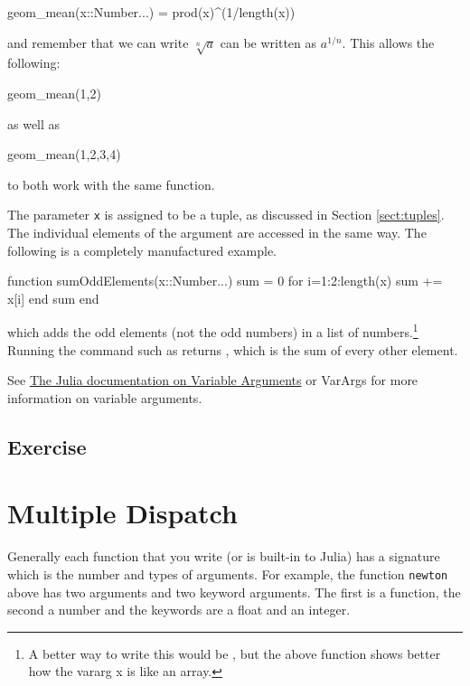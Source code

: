 \begin{jlblock}[adf]
geom_mean(x::Number...) = prod(x)^(1/length(x))
\end{jlblock}
%
and remember that we can write $\sqrt[n]{a}$ can be written as $a^{1/n}$. This allows the following:
%
\begin{jlblock}[adf]
geom_mean(1,2)
\end{jlblock}
%
as well as
%
\begin{jlblock}[adf]
geom_mean(1,2,3,4)
\end{jlblock}
to both work with the same function.  

The parameter \verb!x! is assigned to be a tuple, as discussed in Section \ref{sect:tuples}.  The individual elements of the argument are accessed in the same way.  The following is a completely manufactured example. 

\begin{jlblock}[adf]
function sumOddElements(x::Number...)
  sum = 0
  for i=1:2:length(x)
    sum += x[i]
  end
  sum
end
\end{jlblock}
which adds the odd elements (not the odd numbers) in a list of numbers.\footnote{A better way to write this would be , but the above function shows better how the vararg x is like an array.}  Running the command such as  returns \printpythontex[verb], which is the sum of every other element. 



See
\href{https://docs.julialang.org/en/v1/manual/functions#Varargs-Functions-1}{The
Julia documentation on Variable Arguments} or VarArgs for more information on
variable arguments.

\subsection{Exercise}




\section{Multiple Dispatch}

Generally each function that you write (or is built-in to Julia) has a signature which is the number and types of arguments. For example, the function \texttt{newton} above has two arguments and two keyword arguments. The first is a function, the second a number and the keywords are a float and an integer. 

